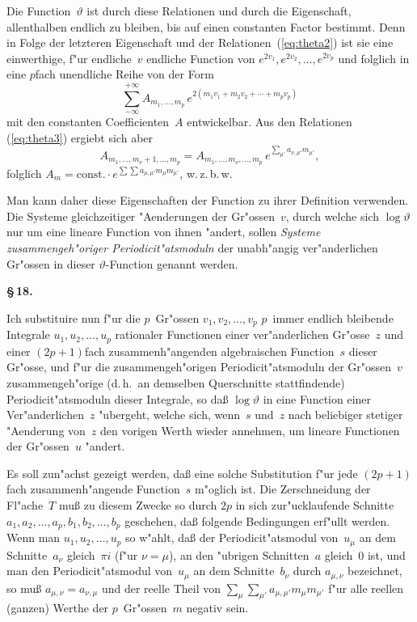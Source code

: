 \documentclass[12pt,a4paper]{book}
\theoremstyle{definition}
\theoremstyle{remark}
\begin{document}
Die Function~$\vartheta$ ist durch diese Relationen und durch die Eigenschaft,
allenthalben endlich zu bleiben, bis auf einen constanten Factor bestimmt.
Denn in Folge der letzteren Eigenschaft und der Relationen~(\ref{eq:theta2})
ist sie eine einwerthige, f"ur endliche~$v$ endliche Function von
$e^{2v_1}, e^{2v_2}, \ldots, e^{2v_p}$ und folglich in eine $p$fach unendliche Reihe
von der Form
\[
\sum_{-\infty}^{+\infty} A_{m_1,\ldots,m_p}\,
  e^{2(m_1 v_1 + m_2 v_2 + \cdots + m_p v_p)}
\]
mit den constanten Coefficienten~$A$ entwickelbar. Aus den Relationen
(\ref{eq:theta3}) ergiebt sich aber
\[
A_{m_1,\ldots,m_\nu+1,\ldots,m_p} =
A_{m_1,\ldots,m_\nu,\ldots,m_p}\,
  e^{\sum_{\mu'} a_{\nu,\mu'} m_{\mu'}},
\]
folglich $A_m = \text{const.} \cdot e^{\sum \sum a_{\mu,\mu'} m_\mu m_{\mu'}}$, w.\,z.\,b.\,w.

Man kann daher diese Eigenschaften der Function zu ihrer Definition
verwenden. Die Systeme gleichzeitiger "Aenderungen der Gr"ossen~$v$,
durch welche sich $\log\vartheta$ nur um eine lineare Function von ihnen "andert,
sollen \emph{Systeme zusammengeh"origer Periodicit"atsmoduln} der unabh"angig
ver"anderlichen Gr"ossen in dieser $\vartheta$-Function genannt werden.

\medskip
\textbf{\S\,18.}

Ich substituire nun f"ur die $p$~Gr"ossen $v_1, v_2, \ldots, v_p$ $p$~immer
endlich bleibende Integrale $u_1, u_2, \ldots, u_p$ rationaler Functionen einer
ver"anderlichen Gr"osse~$z$ und einer $(2p+1)$fach zusammenh"angenden
algebraischen Function~$s$ dieser Gr"osse, und f"ur die zusammengeh"origen
Periodicit"atsmoduln der Gr"ossen~$v$ zusammengeh"orige (d.\,h.\ an demselben
Querschnitte stattfindende) Periodicit"atsmoduln dieser Integrale, so da\ss{}
$\log\vartheta$ in eine Function einer Ver"anderlichen~$z$ "ubergeht, welche sich,
wenn~$s$ und~$z$ nach beliebiger stetiger "Aenderung von~$z$ den vorigen
Werth wieder annehmen, um lineare Functionen der Gr"ossen~$u$ "andert.

Es soll zun"achst gezeigt werden, da\ss{} eine solche Substitution f"ur jede
$(2p+1)$fach zusammenh"angende Function~$s$ m"oglich ist. Die Zerschneidung
der Fl"ache~$T$ mu\ss{} zu diesem Zwecke so durch $2p$ in sich zur"ucklaufende
Schnitte $a_1, a_2, \ldots, a_p, b_1, b_2, \ldots, b_p$ geschehen, da\ss{} folgende
Bedingungen erf"ullt werden. Wenn man $u_1, u_2, \ldots, u_p$ so w"ahlt, da\ss{}
der Periodicit"atsmodul von~$u_\mu$ an dem Schnitte~$a_\nu$ gleich~$\pi i$ (f"ur
$\nu = \mu$), an den "ubrigen Schnitten~$a$ gleich~$0$ ist, und man den
Periodicit"atsmodul von~$u_\mu$ an dem Schnitte~$b_\nu$ durch $a_{\mu,\nu}$
bezeichnet, so mu\ss{} $a_{\mu,\nu} = a_{\nu,\mu}$ und der reelle Theil von
$\sum_\mu \sum_{\mu'} a_{\mu,\mu'} m_\mu m_{\mu'}$ f"ur alle reellen (ganzen) Werthe der
$p$~Gr"ossen~$m$ negativ sein.
\end{document}

